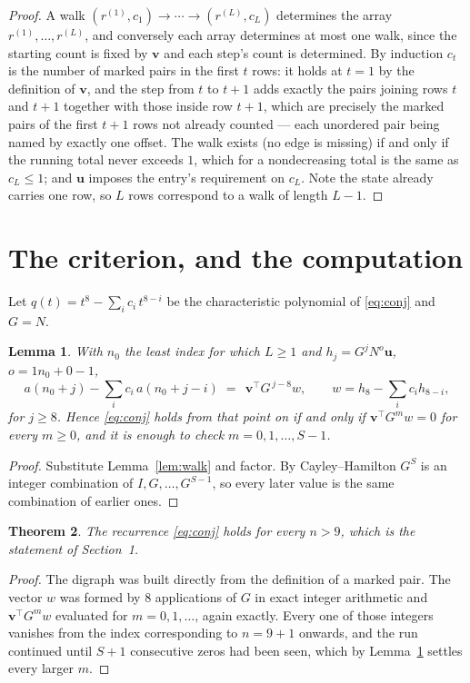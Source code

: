 \documentclass[11pt,a4paper]{article}
\theoremstyle{plain}
\newtheorem{theorem}{Theorem}
\newtheorem{lemma}[theorem]{Lemma}
\theoremstyle{definition}
\begin{document}
\begin{proof}
A walk $(r^{(1)},c_1)\to\cdots\to(r^{(L)},c_L)$ determines the array
$r^{(1)},\dots,r^{(L)}$, and conversely each array determines at most one walk, since the
starting count is fixed by $\mathbf{v}$ and each step's count is determined. By induction
$c_t$ is the number of marked pairs in the first $t$ rows: it holds at $t=1$ by the
definition of $\mathbf{v}$, and the step from $t$ to $t+1$ adds exactly the pairs joining
rows $t$ and $t+1$ together with those inside row $t+1$, which are precisely the marked
pairs of the first $t+1$ rows not already counted --- each unordered pair being named by
exactly one offset. The walk exists (no edge is missing) if and only if the running total
never exceeds $1$, which for a nondecreasing total is the same as $c_L\le1$; and
$\mathbf{u}$ imposes the entry's requirement on $c_L$. Note the state already carries one
row, so $L$ rows correspond to a walk of length $L-1$.
\end{proof}

\section{The criterion, and the computation}

Let $q(t)=t^{8}-\sum_i c_i\,t^{8-i}$ be the characteristic polynomial of
\eqref{eq:conj} and $G=N$.

\begin{lemma}\label{lem:crit}
With $n_0$ the least index for which $L\ge1$ and $h_j=G^{j}N^{o}\mathbf{u}$,
$o=1n_0+0-1$,
\[
a(n_0+j)-\sum_i c_i\,a(n_0+j-i)\;=\;\,\mathbf{v}^{\!\top}G^{\,j-8}w,
\qquad w=h_{8}-\sum_i c_i h_{8-i},
\]
for $j\ge8$. Hence \eqref{eq:conj} holds from that point on if and only if
$\mathbf{v}^{\!\top}G^{m}w=0$ for every $m\ge0$, and it is enough to check
$m=0,1,\dots,S-1$.
\end{lemma}

\begin{proof}
Substitute Lemma~\ref{lem:walk} and factor. By Cayley--Hamilton $G^{S}$ is an integer
combination of $I,G,\dots,G^{S-1}$, so every later value is the same combination of earlier
ones.
\end{proof}

\begin{theorem}
The recurrence \eqref{eq:conj} holds for every $n>9$, which is the statement of
Section~1.
\end{theorem}

\begin{proof}
The digraph was built directly from the definition of a marked pair. The vector $w$ was
formed by $8$ applications of $G$ in exact integer arithmetic and
$\mathbf{v}^{\!\top}G^{m}w$ evaluated for $m=0,1,\dots$, again exactly. Every one of
those integers vanishes from the index corresponding to $n=9+1$ onwards, and the run
continued until $S+1$ consecutive zeros had been seen, which by Lemma~\ref{lem:crit}
settles every larger $m$.
\end{proof}
\end{document}
